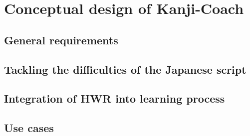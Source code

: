 
\chapter{Conceptual design of Kanji-Coach}
\section{General requirements}
\section{Tackling the difficulties of the Japanese script}
\section{Integration of HWR into learning process}
\section{Use cases}
